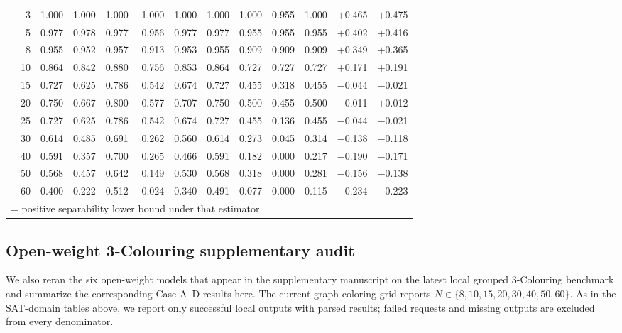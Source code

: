 \documentclass[conference]{IEEEtran}
\theoremstyle{remark}
\begin{document}
\begin{table}[ht]
{\begin{tabular}{p{2.2cm}r rrrr rr rr r rr}
  & 3  & 1.000 & 1.000 & 1.000 & 1.000 & 1.000 & 1.000 & 1.000 & 0.955 & 1.000 & \cellcolor{green!15}$+$0.465 & \cellcolor{green!15}$+$0.475 \\
  & 5  & 0.977 & 0.978 & 0.977 & 0.956 & 0.977 & 0.977 & 0.955 & 0.955 & 0.955 & \cellcolor{green!15}$+$0.402 & \cellcolor{green!15}$+$0.416 \\
  & 8  & 0.955 & 0.952 & 0.957 & 0.913 & 0.953 & 0.955 & 0.909 & 0.909 & 0.909 & \cellcolor{green!15}$+$0.349 & \cellcolor{green!15}$+$0.365 \\
  & 10 & 0.864 & 0.842 & 0.880 & 0.756 & 0.853 & 0.864 & 0.727 & 0.727 & 0.727 & \cellcolor{green!15}$+$0.171 & \cellcolor{green!15}$+$0.191 \\
  & 15 & 0.727 & 0.625 & 0.786 & 0.542 & 0.674 & 0.727 & 0.455 & 0.318 & 0.455 & $-$0.044 & $-$0.021 \\
  & 20 & 0.750 & 0.667 & 0.800 & 0.577 & 0.707 & 0.750 & 0.500 & 0.455 & 0.500 & $-$0.011 & \cellcolor{green!15}$+$0.012 \\
  & 25 & 0.727 & 0.625 & 0.786 & 0.542 & 0.674 & 0.727 & 0.455 & 0.136 & 0.455 & $-$0.044 & $-$0.021 \\
  & 30 & 0.614 & 0.485 & 0.691 & 0.262 & 0.560 & 0.614 & 0.273 & 0.045 & 0.314 & $-$0.138 & $-$0.118 \\
  & 40 & 0.591 & 0.357 & 0.700 & 0.265 & 0.466 & 0.591 & 0.182 & 0.000 & 0.217 & $-$0.190 & $-$0.171 \\
  & 50 & 0.568 & 0.457 & 0.642 & 0.149 & 0.530 & 0.568 & 0.318 & 0.000 & 0.281 & $-$0.156 & $-$0.138 \\
  & 60 & 0.400 & 0.222 & 0.512 & -0.024 & 0.340 & 0.491 & 0.077 & 0.000 & 0.115 & $-$0.234 & $-$0.223 \\
\bottomrule
\multicolumn{13}{l}{\colorbox{green!15}{\phantom{X}} = positive separability lower bound under that estimator.}
\end{tabular}%
}
\end{table}

\subsection{Open-weight 3-Colouring supplementary audit}
\label{sec:os_graph_coloring}

We also reran the six open-weight models that appear in the supplementary manuscript on the latest local grouped 3-Colouring benchmark and summarize the corresponding Case A--D results here.
The current graph-coloring grid reports $N\in\{8,10,15,20,30,40,50,60\}$.
As in the SAT-domain tables above, we report only successful local outputs with parsed results; failed requests and missing outputs are excluded from every denominator.
\end{document}
